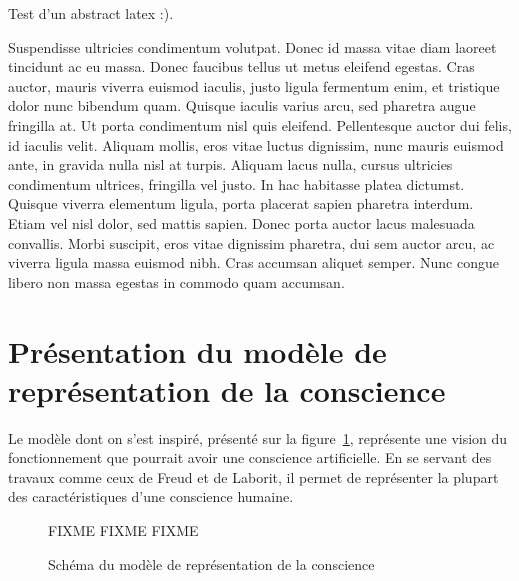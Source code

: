\textrm{Test d'un abstract latex :).}

Suspendisse ultricies condimentum volutpat. Donec id massa vitae diam laoreet
tincidunt ac eu massa. Donec faucibus tellus ut metus eleifend egestas. Cras
auctor, mauris viverra euismod iaculis, justo ligula fermentum enim, et
tristique dolor nunc bibendum quam. Quisque iaculis varius arcu, sed pharetra
augue fringilla at. Ut porta condimentum nisl quis eleifend. Pellentesque
auctor dui felis, id iaculis velit. Aliquam mollis, eros vitae luctus dignissim,
nunc mauris euismod ante, in gravida nulla nisl at turpis. Aliquam lacus nulla,
cursus ultricies condimentum ultrices, fringilla vel justo. In hac habitasse
platea dictumst. Quisque viverra elementum ligula, porta placerat sapien
pharetra interdum. Etiam vel nisl dolor, sed mattis sapien. Donec porta auctor
lacus malesuada convallis. Morbi suscipit, eros vitae dignissim pharetra, dui
sem auctor arcu, ac viverra ligula massa euismod nibh. Cras accumsan aliquet
semper. Nunc congue libero non massa egestas in commodo quam accumsan.

\section{Présentation du modèle de représentation de la conscience}
Le modèle dont on s'est inspiré, présenté sur la figure~\ref{modele_original},
représente une vision du fonctionnement que pourrait avoir une conscience
artificielle. En se servant des travaux comme ceux de Freud et de Laborit, il permet de représenter la plupart des caractéristiques
d’une conscience humaine. 
\begin{figure}[H] 
\centering
FIXME FIXME FIXME
\caption{Schéma du modèle de représentation de la conscience} 
\label{modele_original}
\end{figure}
